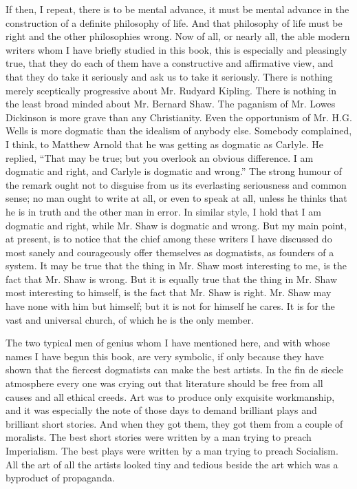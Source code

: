 If then, I repeat, there is to be mental advance, it must be mental advance in the construction of a definite philosophy of life. And that philosophy of life must be right and the other philosophies wrong. Now of all, or nearly all, the able modern writers whom I have briefly studied in this book, this is especially and pleasingly true, that they do each of them have a constructive and affirmative view, and that they do take it seriously and ask us to take it seriously. There is nothing merely sceptically progressive about Mr. Rudyard Kipling. There is nothing in the least broad minded about Mr. Bernard Shaw. The paganism of Mr. Lowes Dickinson is more grave than any Christianity. Even the opportunism of Mr. H.G. Wells is more dogmatic than the idealism of anybody else. Somebody complained, I think, to Matthew Arnold that he was getting as dogmatic as Carlyle. He replied, “That may be true; but you overlook an obvious difference. I am dogmatic and right, and Carlyle is dogmatic and wrong.” The strong humour of the remark ought not to disguise from us its everlasting seriousness and common sense; no man ought to write at all, or even to speak at all, unless he thinks that he is in truth and the other man in error. In similar style, I hold that I am dogmatic and right, while Mr. Shaw is dogmatic and wrong. But my main point, at present, is to notice that the chief among these writers I have discussed do most sanely and courageously offer themselves as dogmatists, as founders of a system. It may be true that the thing in Mr. Shaw most interesting to me, is the fact that Mr. Shaw is wrong. But it is equally true that the thing in Mr. Shaw most interesting to himself, is the fact that Mr. Shaw is right. Mr. Shaw may have none with him but himself; but it is not for himself he cares. It is for the vast and universal church, of which he is the only member.

The two typical men of genius whom I have mentioned here, and with whose names I have begun this book, are very symbolic, if only because they have shown that the fiercest dogmatists can make the best artists. In the fin de siecle atmosphere every one was crying out that literature should be free from all causes and all ethical creeds. Art was to produce only exquisite workmanship, and it was especially the note of those days to demand brilliant plays and brilliant short stories. And when they got them, they got them from a couple of moralists. The best short stories were written by a man trying to preach Imperialism. The best plays were written by a man trying to preach Socialism. All the art of all the artists looked tiny and tedious beside the art which was a byproduct of propaganda.

